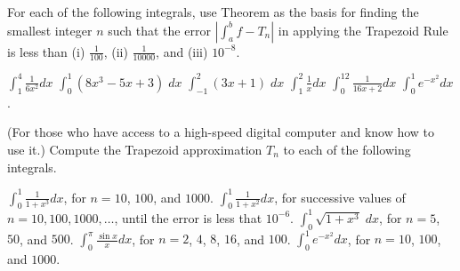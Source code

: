 \begin{exercises}
For each of the following integrals,
use Theorem  as the basis
for finding the smallest integer $n$
such that the error
$|\int_a^b f - T_n|$ in applying the
Trapezoid Rule is less than
(i) $\frac1{100}$, (ii) $\frac1{10000}$,
and (iii) $10^{-8}$.
\begin{exenum}
\x
$\int_1^4 \frac1{6x^2} dx$
\x
$\int_0^1 (8x^3-5x+3) \; dx$
\x
$\int_{-1}^2 (3x+1)\;dx$
\x
$\int_1^2 \frac1x dx$
\x
$\int_0^{12} \frac1{16x+2}dx$
\x
$\int_0^1 e^{-x^2} dx$.
\end{exenum}

(For those who have access to a
high-speed digital computer and know how to use it.)
Compute the Trapezoid approximation $T_n$
to each of the following integrals.
\begin{exenum}
\x
$\int_0^1 \frac1{1+x^3} dx$,
for $n=10$, $100$, and $1000$.
\x
$\int_0^1 \frac1{1+x^2} dx$,
for successive values of $n = 10,100,1000,\ldots$,
until the error is less that $10^{-6}$.
\x
$\int_0^1 \sqrt{1+x^3} \; dx$,
for $n = 5$, $50$, and $500$.
\x
$\int_0^{\pi} \frac{\sin x}x dx$,
for $n = 2$, $4$, $8$, $16$, and $100$.
\x
$\int_0^1 e^{-x^2}dx$,
for $n=10$, $100$, and $1000$.
\end{exenum}

\end{exercises}
